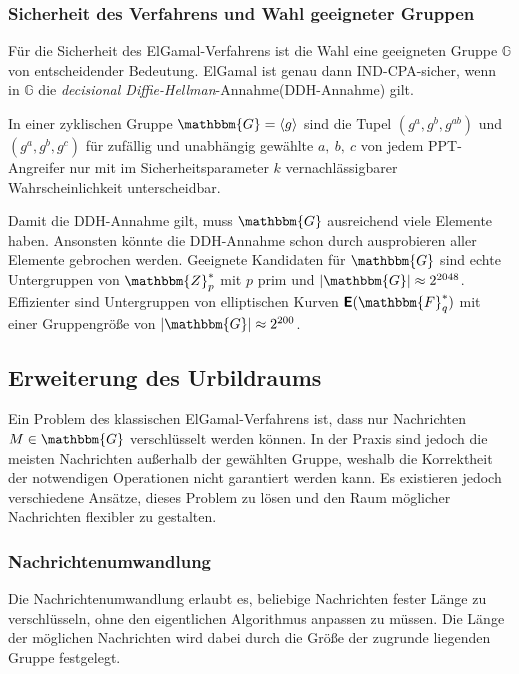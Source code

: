 \subsubsection{Sicherheit des Verfahrens und Wahl geeigneter Gruppen}
Für die Sicherheit des ElGamal-Verfahrens ist die Wahl eine geeigneten
Gruppe $\mathbb{G}$ von entscheidender Bedeutung. ElGamal ist genau dann
IND-CPA-sicher, wenn in $\mathbb{G}$ die \emph{decisional
  Diffie-Hellman}-Annahme\indexDecisionalDiffieHellman (DDH-Annahme)
gilt.
\begin{definition}\label{def:ddh} In einer zyklischen
  Gruppe $\mathbbm{G} = \langle g \rangle$ sind die Tupel $(g^a, g^b,
  g^{ab})$ und $(g^a, g^b, g^c)$ für zufällig und unabhängig gewählte
  $a,~b,~c$ von jedem PPT-Angreifer nur mit im Sicherheitsparameter $k$
  vernachlässigbarer Wahrscheinlichkeit unterscheidbar.
\end{definition}

Damit die DDH-Annahme gilt, muss $\mathbbm{G}$ ausreichend viele
Elemente haben. Ansonsten könnte die DDH-Annahme schon durch
ausprobieren aller Elemente gebrochen werden. Geeignete Kandidaten für
$\mathbbm{G}$ sind echte Untergruppen von $\mathbbm{Z}^*_p$ mit $p$ prim
und $|\mathbbm{G}| \approx 2^{2048}$. Effizienter sind Untergruppen von
elliptischen Kurven $\boldsymbol{\mathsf{E}}(\mathbbm{F}^*_q)$ mit einer
Gruppengröße von $|\mathbbm{G}| \approx 2^{200}$.

\subsection{Erweiterung des Urbildraums} Ein Problem des klassischen
ElGamal-Verfahrens ist, dass nur Nachrichten $M \in \mathbbm{G}$
verschlüsselt werden können. In der Praxis sind jedoch die meisten
Nachrichten außerhalb der gewählten Gruppe, weshalb die Korrektheit der
notwendigen Operationen nicht garantiert werden kann. Es existieren
jedoch verschiedene Ansätze, dieses Problem zu lösen und den Raum
möglicher Nachrichten flexibler zu gestalten.

\subsubsection{Nachrichtenumwandlung} Die Nachrichtenumwandlung
\indexMessageTransformation erlaubt es, beliebige Nachrichten fester
Länge zu verschlüsseln, ohne den eigentlichen Algorithmus anpassen zu
müssen. Die Länge der möglichen Nachrichten wird dabei durch die Größe
der zugrunde liegenden Gruppe festgelegt.

